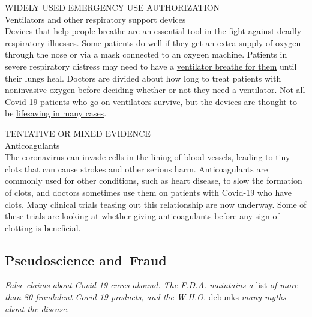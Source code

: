 WIDELY USED EMERGENCY USE AUTHORIZATION\\
Ventilators and other respiratory support devices\\
Devices that help people breathe are an essential tool in the fight
against deadly respiratory illnesses. Some patients do well if they get
an extra supply of oxygen through the nose or via a mask connected to an
oxygen machine. Patients in severe respiratory distress may need to have
a
\href{https://www.nytimes.com/interactive/2020/05/08/health/coronavirus-covid-lungs-ventilators.html}{ventilator
breathe for them} until their lungs heal. Doctors are divided about how
long to treat patients with noninvasive oxygen before deciding whether
or not they need a ventilator. Not all Covid-19 patients who go on
ventilators survive, but the devices are thought to be
\href{https://www.nytimes.com/2020/04/26/health/coronavirus-patient-ventilator.html}{lifesaving
in many cases}.

TENTATIVE OR MIXED EVIDENCE\\
Anticoagulants\\
The coronavirus can invade cells in the lining of blood vessels, leading
to tiny clots that can cause strokes and other serious harm.
Anticoagulants are commonly used for other conditions, such as heart
disease, to slow the formation of clots, and doctors sometimes use them
on patients with Covid-19 who have clots. Many clinical trials teasing
out this relationship are now underway. Some of these trials are looking
at whether giving anticoagulants before any sign of clotting is
beneficial.

\hypertarget{pseudoscience-and-fraud}{%
\subsection{Pseudoscience and~Fraud}\label{pseudoscience-and-fraud}}

\emph{False claims about Covid-19 cures abound. The F.D.A. maintains a}
\href{https://www.fda.gov/consumers/health-fraud-scams/fraudulent-coronavirus-disease-2019-covid-19-products}{list}
\emph{of more than 80 fraudulent Covid-19 products, and the W.H.O.}
\href{https://www.who.int/emergencies/diseases/novel-coronavirus-2019/advice-for-public/myth-busters}{debunks}
\emph{many myths about the disease.}

